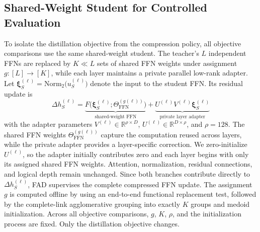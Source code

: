 \documentclass{article}
\newcommand{\R}{\mathbb{R}}
\newcommand{\Norm}{\mathrm{Norm}}
\newcommand{\FFN}{\mathrm{FFN}}
\theoremstyle{plain}
\theoremstyle{definition}
\theoremstyle{remark}
\begin{document}
\subsection{Shared-Weight Student for Controlled Evaluation}
\label{sec:student}

To isolate the distillation objective from the compression policy, all objective comparisons use the same shared-weight student. The teacher's $L$ independent FFNs are replaced by $K\!\ll\!L$ sets of shared FFN weights under assignment $g:[L]\to[K]$, while each layer maintains a private parallel low-rank adapter. Let $\boldsymbol{\xi}_S^{(\ell)} = \Norm_2 \bigl(u_S^{(\ell)} \bigr)$ denote the input to the student FFN. Its residual update is
\begin{equation}
\Delta h_S^{(\ell)} = \underbrace{ F \bigl(\boldsymbol{\xi}_S^{(\ell)};
  \Theta_{\FFN}^{(g(\ell))} \bigr) }_{\text{shared-weight FFN}} +
\underbrace{U^{(\ell)} V^{(\ell)} \boldsymbol{\xi}_S^{(\ell)}
}_{\text{private layer adapter}}
\label{eq:student-ffn}
\end{equation}
with the adapter parameters $V^{(\ell)}\in\R^{\rho\times D}$, $U^{(\ell)}\in\R^{D\times\rho}$, and $\rho=128$. The shared FFN weights $\Theta_{\FFN}^{(g(\ell))}$ capture the computation reused across layers, while the private adapter provides a layer-specific correction. We zero-initialize $U^{(\ell)}$, so the adapter initially contributes zero and each layer begins with only its assigned shared FFN weights. Attention, normalization, residual connections, and logical depth remain unchanged. Since both branches contribute directly to $\Delta h_S^{(\ell)}$, FAD supervises the complete compressed FFN update. The assignment $g$ is computed offline by using an end-to-end functional replacement test, followed by the complete-link agglomerative grouping into exactly $K$ groups and medoid initialization. Across all objective comparisons, $g$, $K$, $\rho$, and the initialization process are fixed. Only the distillation objective changes.

%
\end{document}
